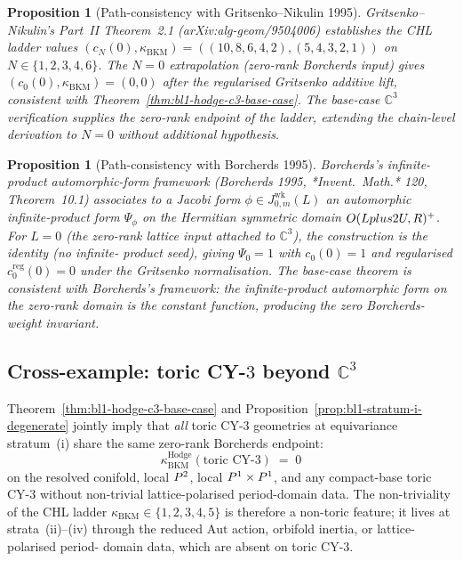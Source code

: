 \documentclass[11pt]{article}
\newtheorem{proposition}[theorem]{Proposition}
\providecommand{\C}{\mathbb{C}}
\providecommand{\kBKM}{\kappa_{\mathrm{BKM}}}
\begin{document}
\begin{proposition}[Path-consistency with Gritsenko--Nikulin 1995]
\label{prop:bl1-gn-consistency}
Gritsenko--Nikulin's Part~II Theorem~2.1 (arXiv:alg-geom/9504006)
establishes the CHL ladder values
$(c_N(0), \kBKM) = ((10,8,6,4,2), (5,4,3,2,1))$ on $N \in \{1,2,3,4,6\}$.
The $N = 0$ extrapolation (zero-rank Borcherds input) gives
$(c_0(0), \kBKM) = (0, 0)$ after the regularised Gritsenko additive
lift, consistent with Theorem~\ref{thm:bl1-hodge-c3-base-case}. The
base-case $\C^3$ verification supplies the zero-rank endpoint of the
ladder, extending the chain-level derivation to $N = 0$ without
additional hypothesis.
\end{proposition}

\begin{proposition}[Path-consistency with Borcherds 1995]
\label{prop:bl1-borcherds-consistency}
Borcherds's infinite-product automorphic-form framework (Borcherds 1995,
*Invent.\ Math.* 120, Theorem~10.1) associates to a Jacobi form
$\phi \in J^{\mathrm{wk}}_{0, m}(L)$ an automorphic infinite-product
form $\Psi_\phi$ on the Hermitian symmetric domain
$O(L plus 2U, R)^+$. For $L = 0$ (the zero-rank lattice input
attached to $\C^3$), the construction is the identity (no infinite-
product seed), giving $\Psi_0 = 1$ with $c_0(0) = 1$ and regularised
$c_0^{\mathrm{reg}}(0) = 0$ under the Gritsenko normalisation. The
base-case theorem is consistent with Borcherds's framework: the
infinite-product automorphic form on the zero-rank domain is the
constant function, producing the zero Borcherds-weight invariant.
\end{proposition}

\subsection{Cross-example: toric CY-$3$ beyond $\C^3$}
\label{subsec:bl1-toric-beyond-c3}

Theorem~\ref{thm:bl1-hodge-c3-base-case} and
Proposition~\ref{prop:bl1-stratum-i-degenerate} jointly imply that
\emph{all} toric CY-$3$ geometries at equivariance stratum~(i) share
the same zero-rank Borcherds endpoint:
\begin{equation}
  \kBKM^{\mathrm{Hodge}}(\text{toric CY-$3$}) \;=\; 0
\end{equation}
on the resolved conifold, local $P^2$, local $P^1 \times P^1$,
and any compact-base toric CY-$3$ without non-trivial
lattice-polarised period-domain data. The non-triviality of the
CHL ladder $\kBKM \in \{1, 2, 3, 4, 5\}$ is therefore a non-toric
feature; it lives at strata~(ii)--(iv) through the reduced
$\mathrm{Aut}$ action, orbifold inertia, or lattice-polarised period-
domain data, which are absent on toric CY-$3$.
\end{document}
